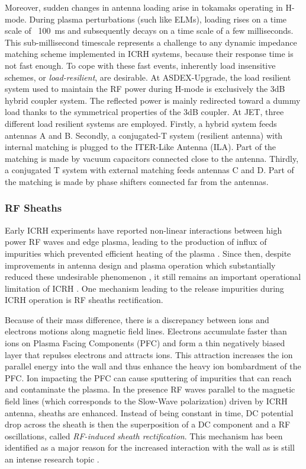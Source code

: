 Moreover, sudden changes in antenna loading arise in tokamaks operating in H-mode. During plasma perturbations (such like ELMs), loading rises on a time scale of ~100~ms and subsequently decays on a time scale of a few milliseconds. This sub-millisecond timescale represents a challenge to any dynamic impedance matching scheme implemented in ICRH systems, because their response time is not fast enough. To cope with these fast events, inherently load insensitive schemes, or \textit{load-resilient}, are desirable. At ASDEX-Upgrade, the load resilient system used to maintain the RF power during H-mode is exclusively the 3dB hybrid coupler system. The reflected power is mainly redirected toward a dummy load thanks to the symmetrical properties of the 3dB coupler. At JET, three different load resilient systems are employed. Firstly, a hybrid system feeds antennas A and B. Secondly, a conjugated-T system (resilient antenna) with internal matching is plugged to the ITER-Like Antenna (ILA). Part of the matching is made by vacuum capacitors connected close to the antenna. Thirdly, a conjugated T system with external matching feeds antennas C and D. Part of the matching is made by phase shifters connected far from the antennas.

\subsubsection{RF Sheaths}
Early ICRH experiments have reported non-linear interactions between high power RF waves and edge plasma, leading to the production of influx of impurities which prevented efficient heating of the plasma . Since then, despite improvements in antenna design and plasma operation which substantially reduced these undesirable phenomenon , it still remains an important operational limitation of ICRH . One mechanism leading to the release impurities during ICRH operation is RF sheaths rectification. 

Because of their mass difference, there is a discrepancy between ions and electrons motions along magnetic field lines. Electrons accumulate faster than ions on Plasma Facing Components (PFC) and form a thin negatively biased layer that repulses electrons and attracts ions. This attraction increases the ion parallel energy into the wall and thus enhance the heavy ion bombardment of the PFC. Ion impacting the PFC can cause sputtering of impurities that can reach and contaminate the plasma. In the presence RF waves parallel to the magnetic field lines (which corresponds to the Slow-Wave polarization) driven by ICRH antenna, sheaths are enhanced. Instead of being constant in time, DC potential drop across the sheath is then the superposition of a DC component and a RF oscillations, called \textit{RF-induced sheath rectification}. This  mechanism has been identified as a major reason for the increased interaction with the wall as is still an intense research topic .




